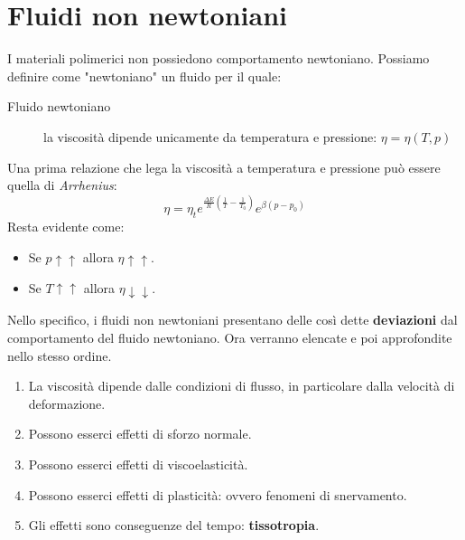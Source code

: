 \chapter{Fluidi non newtoniani}\label{chp:NonNewton}
I materiali polimerici non possiedono comportamento newtoniano.
Possiamo definire come "newtoniano" un fluido per il quale:
\begin{description}
\item[Fluido newtoniano] la viscosità dipende unicamente da temperatura e pressione: $\eta = \eta(T,p)$
\end{description}

Una prima relazione che lega la viscosità a temperatura e pressione può essere quella di \textit{Arrhenius}:
\begin{equation}
\eta = \eta_t e^{\frac{\Delta E}{R}\left(\frac{1}{T}-\frac{1}{T_0}\right)} %
e^{\beta \left(p - p_0\right)}
\label{eqn:Arrhenius}
\end{equation}
Resta evidente come:
\begin{itemize}
\item Se $p \uparrow\uparrow$ allora $\eta \uparrow\uparrow$.
\item Se $T \uparrow\uparrow$ allora $\eta \downarrow\downarrow$. 
\end{itemize}

Nello specifico, i fluidi non newtoniani presentano delle così dette \textbf{deviazioni} dal comportamento del fluido newtoniano.
Ora verranno elencate e poi approfondite nello stesso ordine.

\begin{enumerate}
\item La viscosità dipende dalle condizioni di flusso, in particolare dalla velocità di deformazione.
\item Possono esserci effetti di sforzo normale.
\item Possono esserci effetti di viscoelasticità.
\item Possono esserci effetti di plasticità: ovvero fenomeni di snervamento.
\item Gli effetti sono conseguenze del tempo: \textbf{tissotropia}.
\end{enumerate}

